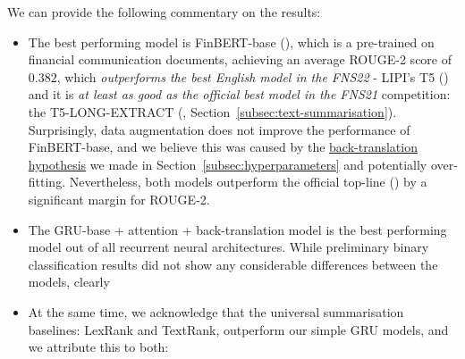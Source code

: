 We can provide the following commentary on the results:
\begin{itemize}
    \item The best performing model is FinBERT-base (\cite{yang2020finbert}), which is a pre-trained on financial communication documents,
        achieving an average ROUGE-2 score of $0.382$, which \emph{outperforms the best English model in the FNS22} - LIPI's T5 (\cite{el-haj-etal-2022-financial})
        and it is \emph{at least as good as the official best model in the FNS21} competition: the T5-LONG-EXTRACT (\cite{orzhenovskii-2021-t5}, Section~\ref{subsec:text-summarisation}).
        Surprisingly, data augmentation does not improve the performance of FinBERT-base, and we believe this was caused by
        the \hyperlink{data_augment_hypothesis}{back-translation hypothesis} we made in Section~\ref{subsec:hyperparameters} and potentially over-fitting.
        Nevertheless, both models outperform the official top-line (\cite{litvak-last-2013-multilingual}) by a significant margin for ROUGE-2.
    \item The GRU-base + attention + back-translation model is the best performing model out of all recurrent neural architectures.
    While preliminary binary classification results did not show any considerable differences between the models, clearly
    \item At the same time, we acknowledge that the universal summarisation baselines: LexRank and TextRank, outperform
        our simple GRU models, and we attribute this to both:
\end{itemize}

